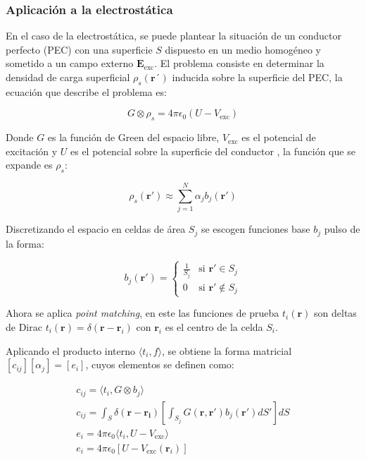 \documentclass[12pt, twocolumn]{article}
\begin{document}
\subsubsection{Aplicación a la electrostática}

En el caso de la electrostática, se puede plantear la situación de un conductor perfecto (PEC) con una superficie $S$ dispuesto en un medio homogéneo y sometido a un campo externo $\mathbf{E}_{\text{exc}}$. El problema consiste en determinar la densidad de carga superficial $\rho_s(\mathbf{r´})$ inducida sobre la superficie del PEC, la ecuación que describe el problema es:

\begin{equation*}
    G \otimes \rho_s = 4\pi \epsilon_0 (U - V_{\text{exc}})  
\end{equation*}

Donde $G$ es la función de Green del espacio libre, $V_{\text{exc}}$ es el potencial de excitación y $U$ es el potencial sobre la superficie del conductor \cite{MoM}, la función que se expande es $\rho_s$:

\begin{equation*}
    \rho_s(\mathbf{r'}) \approx \sum_{j=1}^{N} \alpha_j b_j(\mathbf{r'})
\end{equation*}

Discretizando el espacio en celdas de área $S_j$ se escogen funciones base $b_j$ pulso de la forma:

\[
b_j(\mathbf{r}') =
\begin{cases} 
\frac{1}{S_j} & \text{si } \mathbf{r}' \in S_j \\
0 & \text{si } \mathbf{r}' \notin S_j
\end{cases}
\]

Ahora se aplica \textit{point matching}, en este las funciones de prueba $t_i(\mathbf{r})$ son deltas de Dirac $t_i(\mathbf{r}) = \delta(\mathbf{r}-\mathbf{r}_i)$ con $\mathbf{r}_i$ es el centro de la celda $S_i$.

Aplicando el producto interno $\langle t_i, f \rangle$, se obtiene la forma matricial $[c_{ij}][\alpha_j]=[e_i]$, cuyos elementos se definen como:

\begin{equation*}
    \begin{gathered}
        c_{ij} = \langle t_i, G \otimes b_j \rangle\\
        c_{ij}= \int_S{\delta(\mathbf{r}-\mathbf{r_i})} \left[ \int_{S_{j}}{G(\mathbf{r},\mathbf{r'})b_j(\mathbf{r}')dS'}  \right]dS \\
        e_i = 4\pi\epsilon_0 \langle t_i, U - V_{\text{exc}} \rangle \\
        e_i = 4\pi\epsilon_0 \left[ U - V_{\text{exc}}(\mathbf{r}_i)\right]
    \end{gathered}
\end{equation*}
\end{document}
